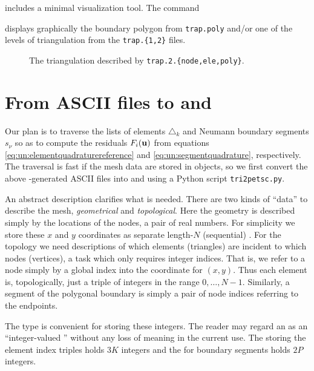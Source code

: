\Triangle includes a minimal visualization tool.  The command
displays graphically the boundary polygon from \texttt{trap.poly} and/or one of the levels of  triangulation from the \texttt{trap.\{1,2\}} files.

\begin{figure}

\caption{The triangulation described by \texttt{trap.2.\{node,ele,poly\}}.}
\label{fig:un:traptwo}
\end{figure}


\section{From ASCII files to \PETSc \pVecs and \pISs}

Our plan is to traverse the lists of elements $\triangle_k$ and Neumann boundary segments $s_\nu$ so as to compute the residuals $F_i(\mathbf{u})$ from equations \eqref{eq:un:elementquadraturereference} and \eqref{eq:un:segmentquadrature}, respectively.  The traversal is fast if the mesh data are stored in \PETSc objects, so we first convert the above \Triangle-generated ASCII files into \pVecs and \pISs using a Python script \texttt{tri2petsc.py}.

An abstract description clarifies what is needed.  There are two kinds of ``data'' to describe the mesh, \emph{geometrical} and \emph{topological}.  Here the geometry is described simply by the locations of the nodes, a pair of real numbers.  For simplicity we store these $x$ and $y$ coordinates as separate length-$N$ (sequential) \pVecs.  For the topology we need descriptions of which elements (triangles) are incident to which nodes (vertices), a task which only requires integer indices.  That is, we refer to a node simply by a global index into the coordinate \pVecs for $(x,y)$.  Thus each element is, topologically, just a triple of integers in the range $0,\dots,N-1$.  Similarly, a segment of the polygonal boundary is simply a pair of node indices referring to the endpoints.

The \PETSc \pIS type is convenient for storing these integers.  The reader may regard an \pIS as an ``integer-valued \pVec'' without any loss of meaning in the current use.  The \pIS storing the element index triples holds $3K$ integers and the \pIS for boundary segments holds $2P$ integers.

